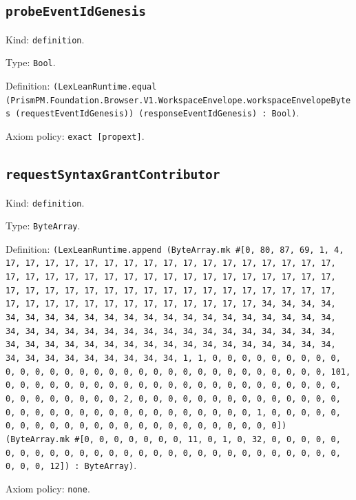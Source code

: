 \documentclass[11pt]{article}
\begin{document}
\subsection*{\texttt{probeEventIdGenesis}}
\noindent Kind: \texttt{definition}.\par
\noindent Type: \texttt{Bool}.\par
\noindent Definition: \texttt{(LexLeanRuntime.equal (PrismPM.Foundation.Browser.V1.WorkspaceEnvelope.workspaceEnvelopeBytes (requestEventIdGenesis)) (responseEventIdGenesis) : Bool)}.\par
\noindent Axiom policy: \texttt{exact [propext]}.\par
\subsection*{\texttt{requestSyntaxGrantContributor}}
\noindent Kind: \texttt{definition}.\par
\noindent Type: \texttt{ByteArray}.\par
\noindent Definition: \texttt{(LexLeanRuntime.append (ByteArray.mk \#[0, 80, 87, 69, 1, 4, 17, 17, 17, 17, 17, 17, 17, 17, 17, 17, 17, 17, 17, 17, 17, 17, 17, 17, 17, 17, 17, 17, 17, 17, 17, 17, 17, 17, 17, 17, 17, 17, 17, 17, 17, 17, 17, 17, 17, 17, 17, 17, 17, 17, 17, 17, 17, 17, 17, 17, 17, 17, 17, 17, 17, 17, 17, 17, 17, 17, 17, 17, 17, 17, 34, 34, 34, 34, 34, 34, 34, 34, 34, 34, 34, 34, 34, 34, 34, 34, 34, 34, 34, 34, 34, 34, 34, 34, 34, 34, 34, 34, 34, 34, 34, 34, 34, 34, 34, 34, 34, 34, 34, 34, 34, 34, 34, 34, 34, 34, 34, 34, 34, 34, 34, 34, 34, 34, 34, 34, 34, 34, 34, 34, 34, 34, 34, 34, 1, 1, 0, 0, 0, 0, 0, 0, 0, 0, 0, 0, 0, 0, 0, 0, 0, 0, 0, 0, 0, 0, 0, 0, 0, 0, 0, 0, 0, 0, 0, 0, 0, 101, 0, 0, 0, 0, 0, 0, 0, 0, 0, 0, 0, 0, 0, 0, 0, 0, 0, 0, 0, 0, 0, 0, 0, 0, 0, 0, 0, 0, 0, 0, 0, 2, 0, 0, 0, 0, 0, 0, 0, 0, 0, 0, 0, 0, 0, 0, 0, 0, 0, 0, 0, 0, 0, 0, 0, 0, 0, 0, 0, 0, 0, 0, 0, 1, 0, 0, 0, 0, 0, 0, 0, 0, 0, 0, 0, 0, 0, 0, 0, 0, 0, 0, 0, 0, 0, 0, 0, 0]) (ByteArray.mk \#[0, 0, 0, 0, 0, 0, 0, 11, 0, 1, 0, 32, 0, 0, 0, 0, 0, 0, 0, 0, 0, 0, 0, 0, 0, 0, 0, 0, 0, 0, 0, 0, 0, 0, 0, 0, 0, 0, 0, 0, 0, 0, 0, 12]) : ByteArray)}.\par
\noindent Axiom policy: \texttt{none}.\par
\end{document}
